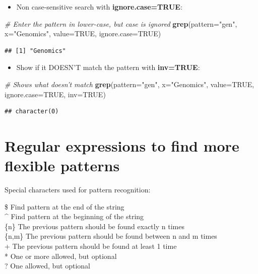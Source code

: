 \documentclass[]{book}
\newenvironment{Shaded}{\begin{snugshade}}{\end{snugshade}}
\newcommand{\CommentTok}[1]{\textcolor[rgb]{0.56,0.35,0.01}{\textit{#1}}}
\newcommand{\DataTypeTok}[1]{\textcolor[rgb]{0.13,0.29,0.53}{#1}}
\newcommand{\KeywordTok}[1]{\textcolor[rgb]{0.13,0.29,0.53}{\textbf{#1}}}
\newcommand{\NormalTok}[1]{#1}
\newcommand{\OtherTok}[1]{\textcolor[rgb]{0.56,0.35,0.01}{#1}}
\newcommand{\StringTok}[1]{\textcolor[rgb]{0.31,0.60,0.02}{#1}}
\providecommand{\tightlist}{%
  \setlength{\itemsep}{0pt}\setlength{\parskip}{0pt}}
\begin{document}
\begin{itemize}
\tightlist
\item
  Non case-sensitive search with \textbf{ignore.case=TRUE}:
\end{itemize}

\begin{Shaded}
\begin{Highlighting}[]
\CommentTok{# Enter the pattern in lower-case, but case is ignored}
\KeywordTok{grep}\NormalTok{(}\DataTypeTok{pattern=}\StringTok{"gen"}\NormalTok{,}
        \DataTypeTok{x=}\StringTok{"Genomics"}\NormalTok{,}
        \DataTypeTok{value=}\OtherTok{TRUE}\NormalTok{,}
        \DataTypeTok{ignore.case=}\OtherTok{TRUE}\NormalTok{)}
\end{Highlighting}
\end{Shaded}

\begin{verbatim}
## [1] "Genomics"
\end{verbatim}

\begin{itemize}
\tightlist
\item
  Show if it DOESN'T match the pattern with \textbf{inv=TRUE}:
\end{itemize}

\begin{Shaded}
\begin{Highlighting}[]
\CommentTok{# Shows what doesn't match}
\KeywordTok{grep}\NormalTok{(}\DataTypeTok{pattern=}\StringTok{"gen"}\NormalTok{,}
        \DataTypeTok{x=}\StringTok{"Genomics"}\NormalTok{,}
        \DataTypeTok{value=}\OtherTok{TRUE}\NormalTok{,}
        \DataTypeTok{ignore.case=}\OtherTok{TRUE}\NormalTok{,}
    \DataTypeTok{inv=}\OtherTok{TRUE}\NormalTok{)}
\end{Highlighting}
\end{Shaded}

\begin{verbatim}
## character(0)
\end{verbatim}

\hypertarget{regular-expressions-to-find-more-flexible-patterns}{%
\section{Regular expressions to find more flexible patterns}\label{regular-expressions-to-find-more-flexible-patterns}}

Special characters used for pattern recognition:

\$ \textbar{} Find pattern at the end of the string \textbar{}\\
\^{} \textbar{} Find pattern at the beginning of the string \textbar{}\\
\{n\} \textbar{} The previous pattern should be found exactly n times \textbar{}\\
\{n,m\} \textbar{} The previous pattern should be found between n and m times\textbar{}\\
+ \textbar{} The previous pattern should be found at least 1 time \textbar{}\\
* \textbar{} One or more allowed, but optional \textbar{}\\
? \textbar{} One allowed, but optional \textbar{}
\end{document}
